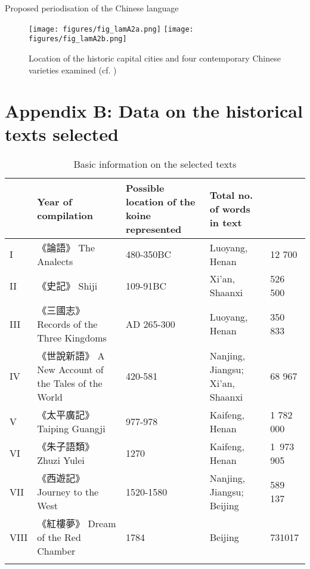 \documentclass[output=paper]{langscibook}
\begin{document}
\begin{table}
	\caption{Proposed periodisation of the Chinese language}
	\label{tab:lamA1}
\end{table}

\begin{figure}
	\caption{Location of the historic capital cities and four contemporary Chinese varieties
	examined (cf. \citealt{Zhou1995, Wan1958})}
	\label{fig:lamA2}
	\texttt{[image: figures/fig\_lamA2a.png]}
	\texttt{[image: figures/fig\_lamA2b.png]}
\end{figure}

\clearpage
\section*{Appendix \hypertarget{app:lamB}{B}: Data on the historical texts selected}

\begin{sidewaystable}
  \begin{tabularx}{\textwidth}{L{0.5cm}XL{2cm}L{3cm}L{2cm}}
    \lsptoprule
     & Year of compilation & Possible location of the koine represented & Total no. of words in text\\
     \midrule
I & 《論語》 The Analects & 480-350BC & Luoyang, Henan & 12 700\\
II	& 《史記》 Shiji & 109-91BC & Xi'an, Shaanxi & 526 500\\
III	& 《三國志》 Records of the Three Kingdoms & AD 265-300 & Luoyang, Henan & 350 833\\
IV	& 《世說新語》 A New Account of the Tales of the World & 420-581 & Nanjing, Jiangsu; Xi'an, Shaanxi & 68 967\\
V & 《太平廣記》Taiping Guangji & 977-978 & Kaifeng, Henan & 1 782 000\\
VI & 《朱子語類》 Zhuzi Yulei & 1270 & Kaifeng, Henan & 1 973 905\\
VII & 《西遊記》 Journey to the West & 1520-1580 & Nanjing, Jiangsu; Beijing & 589 137\\
VIII & 《紅樓夢》 Dream of the Red Chamber & 1784 & Beijing & 731017\\
\lspbottomrule
\end{tabularx}
  \caption{Basic information on the selected texts}
  \label{tab:lamB1}
\end{sidewaystable}
\end{document}
